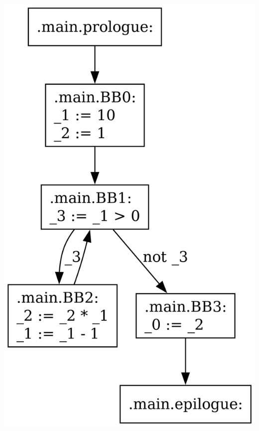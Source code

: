\documentclass{beamer}
\begin{document}
\begin{frame}[fragile]
\begin{columns}
        \begin{column}{.5\textwidth}
            \begin{center}
                \includegraphics[width=\textwidth,height=0.8\textheight,keepaspectratio]{graphs/fact_opti.dot.png}
            \end{center}
        \end{column}
    \end{columns}

\end{frame}
\end{document}
